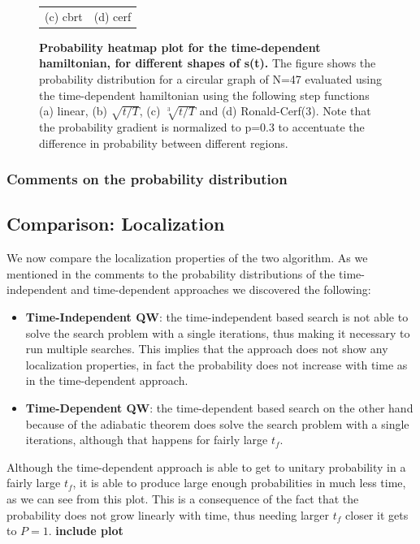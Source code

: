 \begin{figure}[ht]
\begin{tabular}{cc}
        (c) cbrt & (d) cerf\\[6pt]
        \end{tabular}
        \caption[Probability heatmap plot for the time-dependent hamiltonian, for different shapes of s(t)]{\textbf{Probability heatmap plot for the time-dependent hamiltonian, for different shapes of s(t).} The figure shows the probability distribution for a circular graph of N=47 evaluated using the time-dependent hamiltonian using the following step functions (a) linear, (b) $\sqrt{t/T}$, (c) $\sqrt[3]{t/T}$ and (d) Ronald-Cerf(3). Note that the probability gradient is normalized to p=0.3 to accentuate the difference in probability between different regions. }
        \end{figure}

        \subsubsection*{Comments on the probability distribution}
        \clearpage

    \subsection{Comparison: Localization}
        We now compare the localization properties of the two algorithm. As we mentioned in the comments to the probability distributions of the time-independent and time-dependent approaches we discovered the following:
        \begin{itemize}
            \item \textbf{Time-Independent QW}: the time-independent based search is not able to solve the search problem with a single iterations, thus making it necessary to run multiple searches. This implies that the approach does not show any localization properties, in fact the probability does not increase with time as in the time-dependent approach.
            \item \textbf{Time-Dependent QW}: the time-dependent based search on the other hand because of the adiabatic theorem does solve the search problem with a single iterations, although that happens for fairly large $t_f$.
        \end{itemize}
        Although the time-dependent approach is able to get to unitary probability in a fairly large $t_f$, it is able to produce large enough probabilities in much less time, as we can see from this plot. This is a consequence of the fact that the probability does not grow linearly with time, thus needing larger $t_f$ closer it gets to $P=1$. \textbf{include plot}


